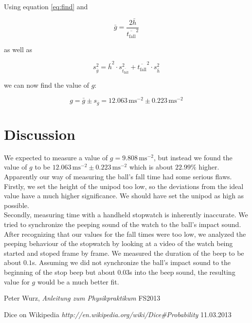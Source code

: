 \documentclass{scrreprt}
\newcommand{\unit}[1]{\ensuremath{\, \mathrm{#1}}}
\begin{document}
Using equation \ref{eq:find} and 

\begin{equation}
\bar{g} = \frac{2 \bar{h}}{\overline{t_{\text{fall}}}^2}
\end{equation}

as well as 

\begin{equation}
s_{\bar{g}}^2 = \bar{h}^2 \cdot s_{\overline{t_{\text{fall}}}}^2 + \overline{t_{\text{fall}}}^2 \cdot s_{\bar{h}}^2
\end{equation}

we can now find the value of $g$:

\begin{equation}
g = \bar{g} \pm s_{\bar{g}} = 12.063\unit{m s^{-2}} \pm 0.223\unit{m s^{-2}}
\end{equation}

\section{Discussion}
We expected to measure a value of $g = 9.808\unit{ms^{-2}}$, but instead we found the value of $g$ to be $12.063\unit{m s^{-2}} \pm 0.223\unit{m s^{-2}}$ which is about $22.99\%$ higher.\\
Apparently our way of measuring the ball's fall time had some serious flaws.\\
Firstly, we set the height of the unipod too low, so the deviations from the ideal value have a much higher significance. We should have set the unipod as high as possible.\\
Secondly, measuring time with a handheld stopwatch is inherently inaccurate. We tried to synchronize the peeping sound of the watch to the ball's impact sound. After recognizing that our values for the fall times were too low, we analyzed the peeping behaviour of the stopwatch by looking at a video of the watch being started and stoped frame by frame. We measured the duration of the beep to be about $0.1$s. Assuming we did not synchronize the ball's impact sound to the beginning of the stop beep but about $0.03$s into the beep sound, the resulting value for $g$ would be a much better fit.

\begin{thebibliography}{9}

  Peter Wurz,
  \emph{Anleitung zum Physikpraktikum}
  FS2013
  
	Dice on Wikipedia
	\emph{http://en.wikipedia.org/wiki/Dice\#Probability}
	11.03.2013

\end{thebibliography}
\end{document}
